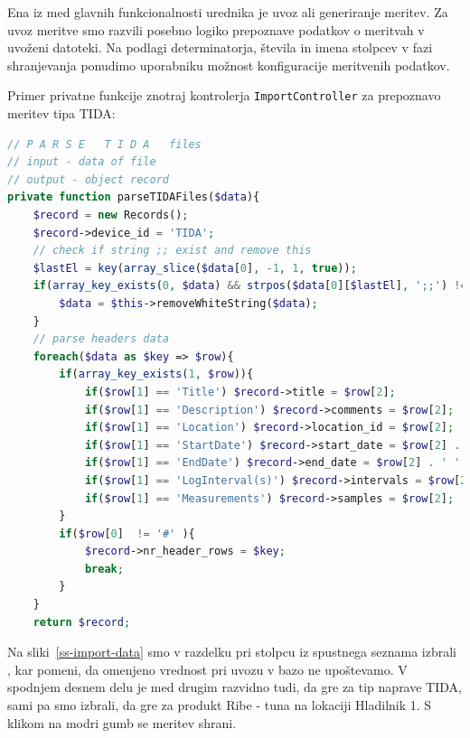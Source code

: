 \documentclass[a4paper, 12pt]{book}
\begin{document}
Ena iz med glavnih funkcionalnosti urednika je uvoz ali generiranje meritev. 
Za uvoz meritve smo razvili posebno logiko prepoznave podatkov o meritvah v uvoženi datoteki. Na podlagi determinatorja, števila in imena stolpcev v fazi shranjevanja ponudimo uporabniku možnost konfiguracije meritvenih podatkov.

\clearpage

Primer privatne funkcije znotraj kontrolerja \verb=ImportController= za prepoznavo meritev tipa TIDA:

\begin{lstlisting}[language=PHP, style=mystyle]
// P A R S E   T I D A   files
// input - data of file
// output - object record
private function parseTIDAFiles($data){
    $record = new Records();
    $record->device_id = 'TIDA';
    // check if string ;; exist and remove this
    $lastEl = key(array_slice($data[0], -1, 1, true));
    if(array_key_exists(0, $data) && strpos($data[0][$lastEl], ';;') !== false){
        $data = $this->removeWhiteString($data);
    }
    // parse headers data
    foreach($data as $key => $row){
        if(array_key_exists(1, $row)){
            if($row[1] == 'Title') $record->title = $row[2];
            if($row[1] == 'Description') $record->comments = $row[2];
            if($row[1] == 'Location') $record->location_id = $row[2];
            if($row[1] == 'StartDate') $record->start_date = $row[2] . ' ' . $row[3];
            if($row[1] == 'EndDate') $record->end_date = $row[2] . ' ' . $row[3];
            if($row[1] == 'LogInterval(s)') $record->intervals = $row[2];
            if($row[1] == 'Measurements') $record->samples = $row[2];
        }
        if($row[0]  != '#' ){ 
            $record->nr_header_rows = $key; 
            break;
        }
    }
    return $record;
\end{lstlisting}


Na sliki~\ref{ss-import-data} smo v razdelku  pri stolpcu  iz spustnega seznama izbrali , kar pomeni, da omenjeno vrednost pri uvozu v bazo ne upoštevamo. V spodnjem desnem delu je med drugim razvidno tudi, da gre za tip naprave TIDA, sami pa smo izbrali, da gre za produkt Ribe - tuna na lokaciji Hladilnik 1. S klikom na modri gumb  se meritev shrani.
\end{document}
